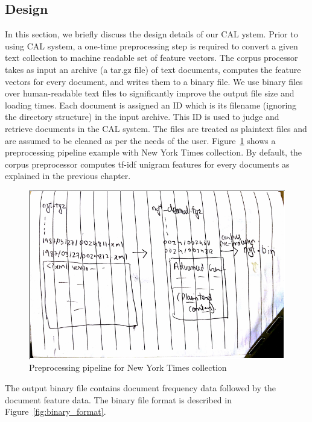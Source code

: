 \subsection{Design}
In this section, we briefly discuss the design details of our CAL
ystem.
Prior to using CAL system, a one-time preprocessing step is required to convert a
given text collection to machine readable set of feature vectors. The corpus
processor takes as input an archive (a tar.gz file) of text documents, computes
the feature vectors for every document, and writes them to a binary file. We use
binary files over human-readable text files to significantly improve the output
file size and loading times. 
Each document is assigned an ID which is its filename (ignoring the directory
structure) in the input archive. This ID is used to judge and retrieve documents
in the CAL system. The files are treated as plaintext files and are assumed to
be cleaned as per the needs of the user. Figure~\ref{fig:preprocessing} shows
a preprocessing pipeline example with New York Times collection.  By default, the
corpus preprocessor computes tf-idf unigram features for every documents as
explained in the previous chapter.
\begin{figure}[h]
\includegraphics[width=\textwidth]{tmp_pictures/preprocessing_pipeline.png}
\caption{Preprocessing pipeline for New York Times collection}
\label{fig:preprocessing}
\end{figure}
The output binary file contains document frequency data followed by the document
feature data. The binary file format is described in
Figure~\ref{fig:binary_format}.
